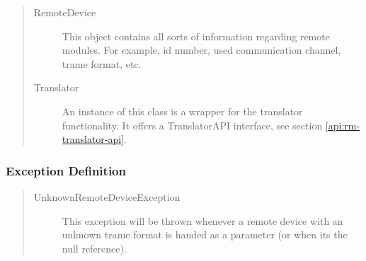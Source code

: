 \begin{quote}
	\begin{description}
		\item[RemoteDevice] This object contains all sorts of information regarding
		remote modules. For example, id number, used communication channel, trame
		format, etc.
		\item[Translator] An instance of this class is a wrapper for the translator
		functionality. It offers a TranslatorAPI interface, see section
		\ref{api:rm-translator-api}.
	\end{description} 
\end{quote}

\subsubsection{Exception Definition} 

\begin{quote}
	\begin{description}
		\item[UnknownRemoteDeviceException] This exception will be thrown whenever a
		remote device with an unknown trame format is handed as a parameter (or when
		its the null reference).
	\end{description} 
\end{quote}